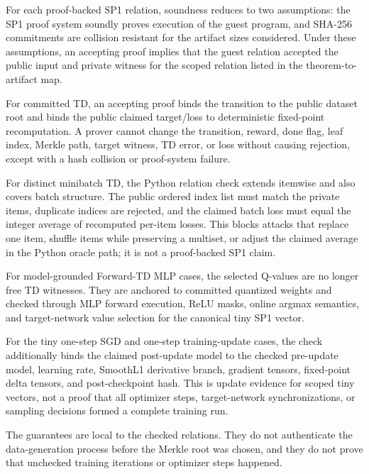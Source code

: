For each proof-backed SP1 relation, soundness reduces to two assumptions: the
SP1 proof system soundly proves execution of the guest program, and SHA-256
commitments are collision resistant for the artifact sizes considered. Under
these assumptions, an accepting proof implies that the guest relation accepted
the public input and private witness for the scoped relation listed in the
theorem-to-artifact map.

For committed TD, an accepting proof binds the transition to the public dataset
root and binds the public claimed target/loss to deterministic fixed-point
recomputation. A prover cannot change the transition, reward, done flag, leaf
index, Merkle path, target witness, TD error, or loss without causing rejection,
except with a hash collision or proof-system failure.

For distinct minibatch TD, the Python relation check extends itemwise and also
covers batch structure. The public ordered index list must match the private
items, duplicate indices are rejected, and the claimed batch loss must equal
the integer average of recomputed per-item losses. This blocks attacks that
replace one item, shuffle items while preserving a multiset, or adjust the
claimed average in the Python oracle path; it is not a proof-backed SP1 claim.

For model-grounded Forward-TD MLP cases, the selected Q-values are no longer
free TD witnesses. They are anchored to committed quantized weights and checked
through MLP forward execution, ReLU masks, online argmax semantics, and
target-network value selection for the canonical tiny SP1 vector.

For the tiny one-step SGD and one-step training-update cases, the check
additionally binds the claimed post-update model to the checked pre-update
model, learning rate, SmoothL1 derivative branch, gradient tensors, fixed-point
delta tensors, and post-checkpoint hash. This is update evidence for scoped
tiny vectors, not a proof that all optimizer steps, target-network
synchronizations, or sampling decisions formed a complete training run.

The guarantees are local to the checked relations. They do not authenticate the
data-generation process before the Merkle root was chosen, and they do not prove
that unchecked training iterations or optimizer steps happened.
